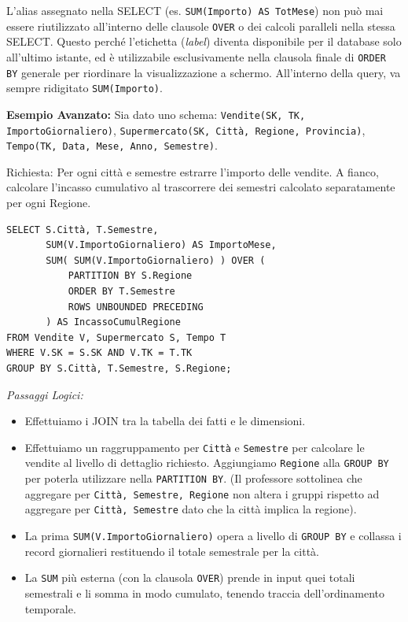 \begin{osservazione}
L'alias assegnato nella SELECT (es. \texttt{SUM(Importo) AS TotMese}) non può mai essere riutilizzato all'interno delle clausole \texttt{OVER} o dei calcoli paralleli nella stessa SELECT. Questo perché l'etichetta (\textit{label}) diventa disponibile per il database solo all'ultimo istante, ed è utilizzabile esclusivamente nella clausola finale di \texttt{ORDER BY} generale per riordinare la visualizzazione a schermo. All'interno della query, va sempre ridigitato \texttt{SUM(Importo)}.
\end{osservazione}

\textbf{Esempio Avanzato:}
Sia dato uno schema:
\texttt{Vendite(SK, TK, ImportoGiornaliero)}, 
\texttt{Supermercato(SK, Città, Regione, Provincia)}, 
\texttt{Tempo(TK, Data, Mese, Anno, Semestre)}.

Richiesta: Per ogni città e semestre estrarre l'importo delle vendite. A fianco, calcolare l'incasso cumulativo al trascorrere dei semestri calcolato separatamente per ogni Regione.
\begin{verbatim}
SELECT S.Città, T.Semestre, 
       SUM(V.ImportoGiornaliero) AS ImportoMese,
       SUM( SUM(V.ImportoGiornaliero) ) OVER (
           PARTITION BY S.Regione 
           ORDER BY T.Semestre 
           ROWS UNBOUNDED PRECEDING
       ) AS IncassoCumulRegione
FROM Vendite V, Supermercato S, Tempo T
WHERE V.SK = S.SK AND V.TK = T.TK
GROUP BY S.Città, T.Semestre, S.Regione;
\end{verbatim}
\textit{Passaggi Logici:} 
\begin{itemize}
    \item Effettuiamo i JOIN tra la tabella dei fatti e le dimensioni.
    \item Effettuiamo un raggruppamento per \texttt{Città} e \texttt{Semestre} per calcolare le vendite al livello di dettaglio richiesto. Aggiungiamo \texttt{Regione} alla \texttt{GROUP BY} per poterla utilizzare nella \texttt{PARTITION BY}. (Il professore sottolinea che aggregare per \texttt{Città, Semestre, Regione} non altera i gruppi rispetto ad aggregare per \texttt{Città, Semestre} dato che la città implica la regione).
    \item La prima \texttt{SUM(V.ImportoGiornaliero)} opera a livello di \texttt{GROUP BY} e collassa i record giornalieri restituendo il totale semestrale per la città.
    \item La \texttt{SUM} più esterna (con la clausola \texttt{OVER}) prende in input quei totali semestrali e li somma in modo cumulato, tenendo traccia dell'ordinamento temporale.
\end{itemize}

